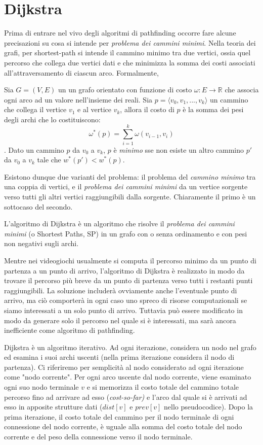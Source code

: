 \documentclass[11pt]{book}
\begin{document}
\section{Dijkstra}
\label{sec:dijkstra}
\par{Prima di entrare nel vivo degli algoritmi di pathfinding occorre fare alcune precisazioni su cosa si intende per \emph{problema dei cammini minimi}. Nella  teoria  dei  grafi, per shortest-path si intende il cammino minimo tra due vertici, ossia quel percorso che collega due vertici dati e che minimizza la somma dei costi associati all'attraversamento di ciascun arco. Formalmente, }
\par{Sia $G = (V, E)$ un un grafo orientato con funzione di costo $\omega: E \rightarrow \mathbb{R}$ che associa ogni arco ad un valore nell'insieme dei reali. Sia $p=\langle v_0, v_1, ..., v_k \rangle$ un cammino che collega il vertice $v_1$ e al vertice $v_k$, allora il costo di $p$ \`e la somma dei pesi degli archi che lo costituiscono: $$\omega^*(p) = \sum \limits_{i=1}^k \omega(v_{i-1}, v_i) $$.
Dato un cammino $p$ da $v_0$ a $v_k$, $p$ \`e \emph{minimo} sse non esiste un altro cammino $p'$ da $v_0$ a $v_k$ tale che $w^*(p') < w^*(p)$.}
\par{Esistono dunque due varianti del problema: il problema del \emph{cammino minimo} tra una coppia di vertici, e il \emph{problema dei cammini minimi} da un vertice sorgente verso tutti gli altri vertici raggiungibili dalla sorgente. Chiaramente il primo \`e un sottocaso del secondo. }
\par{
L'algoritmo di Dijkstra \`e un algoritmo che risolve il \emph{problema dei cammini minimi} (o Shortest Paths, SP) in un grafo con o senza ordinamento e con pesi non negativi sugli archi.}
\par{Mentre nei videogiochi usualmente si computa il percorso minimo da un punto di partenza a un punto di arrivo, l'algoritmo di Dijkstra \`e realizzato in modo da trovare il percorso pi\`u breve da un punto di partenza verso tutti i restanti punti raggiungibili.
La soluzione includer\`a ovviamente anche l'eventuale punto di arrivo, ma ci\`o comporter\`a in ogni caso uno spreco di risorse computazionali se siamo interessati a un solo punto di arrivo.
Tuttavia pu\`o essere modificato in modo da generare solo il percorso nel quale si \`e interessati, ma sar\`a ancora inefficiente come algoritmo di pathfinding.
}
\par{
Dijkstra \`e un algoritmo iterativo. Ad ogni iterazione, considera un nodo nel grafo ed esamina i suoi archi uscenti (nella prima iterazione considera il nodo di partenza). Ci riferiremo per semplicit\`a al nodo considerato ad ogni iterazione come "nodo corrente".
Per ogni arco uscente dal nodo corrente, viene esaminato ogni suo nodo terminale $v$ e si memorizza il costo totale del cammino totale percorso fino ad arrivare ad esso (\emph{cost-so-far)} e l'arco dal quale si \`e arrivati ad esso in apposite strutture dati ($dist[v]$ e $prev[v]$ nello pseudocodice). Dopo la prima iterazione, il costo totale del cammino per il nodo terminale di ogni connessione del nodo corrente, \`e uguale alla somma del costo totale del nodo corrente e del peso della connessione verso il nodo terminale.
}
\end{document}
